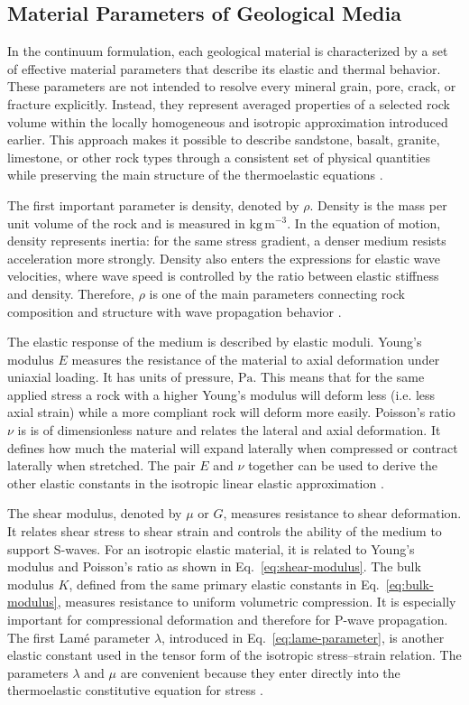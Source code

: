 \subsection{Material Parameters of Geological Media}

In the continuum formulation, each geological material is characterized by a set of effective material parameters that describe its elastic and thermal behavior. These parameters are not intended to resolve every mineral grain, pore, crack, or fracture explicitly. Instead, they represent averaged properties of a selected rock volume within the locally homogeneous and isotropic approximation introduced earlier. This approach makes it possible to describe sandstone, basalt, granite, limestone, or other rock types through a consistent set of physical quantities while preserving the main structure of the thermoelastic equations \cite{mavko2009,jaeger2007}.

The first important parameter is density, denoted by \(\rho\). Density is the mass per unit volume of the rock and is measured in \(\mathrm{kg\,m^{-3}}\). In the equation of motion, density represents inertia: for the same stress gradient, a denser medium resists acceleration more strongly. Density also enters the expressions for elastic wave velocities, where wave speed is controlled by the ratio between elastic stiffness and density. Therefore, \(\rho\) is one of the main parameters connecting rock composition and structure with wave propagation behavior \cite{aki2002,mavko2009}.

The elastic response of the medium is described by elastic moduli. Young's modulus \(E\) measures the resistance of the material to axial deformation under uniaxial loading. It has units of pressure, \(\mathrm{Pa}\). This means that for the same applied stress a rock with a higher Young's modulus will deform less (i.e. less axial strain) while a more compliant rock will deform more easily. Poisson’s ratio \(\nu\) is  is of dimensionless nature and relates the lateral and axial deformation. It defines how much the material will expand laterally when compressed or contract laterally when stretched. The pair \(E\) and \(\nu\) together can be used to derive the other elastic constants in the isotropic linear elastic approximation \cite{jaeger2007,mavko2009}.

The shear modulus, denoted by \(\mu\) or \(G\), measures resistance to shear deformation. It relates shear stress to shear strain and controls the ability of the medium to support S-waves. For an isotropic elastic material, it is related to Young's modulus and Poisson's ratio as shown in Eq.~\eqref{eq:shear-modulus}. The bulk modulus \(K\), defined from the same primary elastic constants in Eq.~\eqref{eq:bulk-modulus}, measures resistance to uniform volumetric compression. It is especially important for compressional deformation and therefore for P-wave propagation. The first Lamé parameter \(\lambda\), introduced in Eq.~\eqref{eq:lame-parameter}, is another elastic constant used in the tensor form of the isotropic stress--strain relation. The parameters \(\lambda\) and \(\mu\) are convenient because they enter directly into the thermoelastic constitutive equation for stress \cite{aki2002,jaeger2007}.

